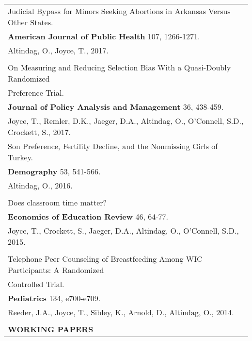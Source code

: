 \documentclass[12 pt]{article}
\begin{document}
\begin{longtable}{ccccc}
\\
   \multicolumn{5}{l}{Judicial Bypass for Minors Seeking Abortions in Arkansas Versus Other States.} \\
    \multicolumn{5}{l}{\textbf{American Journal of Public Health} 107, 1266-1271. 
} \\
    \multicolumn{5}{l}{Altindag, O., Joyce, T., 2017.}  \\
 
\\
   \multicolumn{5}{l}{On Measuring and Reducing Selection Bias With a Quasi-Doubly Randomized} \\
      \multicolumn{5}{l}{Preference Trial.} \\
     \multicolumn{5}{l}{\textbf{Journal of Policy Analysis and Management} 36, 438-459. } \\
      \multicolumn{5}{l}{Joyce, T., Remler, D.K., Jaeger, D.A., Altindag, O., O'Connell, S.D., Crockett, S., 2017. } \\


   \multicolumn{5}{l}{Son Preference, Fertility Decline, and the Nonmissing Girls of Turkey.} \\
     \multicolumn{5}{l}{\textbf{Demography}  53, 541-566. } \\
      \multicolumn{5}{l}{Altindag, O., 2016. } \\

\\
   \multicolumn{5}{l}{Does classroom time matter?} \\
     \multicolumn{5}{l}{\textbf{Economics of Education Review} 46, 64-77. } \\
      \multicolumn{5}{l}{Joyce, T., Crockett, S., Jaeger, D.A., Altindag, O., O'Connell, S.D., 2015.} \\

\\ \multicolumn{5}{l}{Telephone Peer Counseling of Breastfeeding Among WIC Participants: A Randomized} \\
      \multicolumn{5}{l}{ Controlled Trial.} \\
     \multicolumn{5}{l}{\textbf{Pediatrics} 134, e700-e709. } \\
      \multicolumn{5}{l}{Reeder, J.A., Joyce, T., Sibley, K., Arnold, D., Altindag, O., 2014. } \\


\\


\multicolumn{5}{l}{\textbf{WORKING PAPERS}}\\[2 pt]


\end{longtable}
\end{document}
